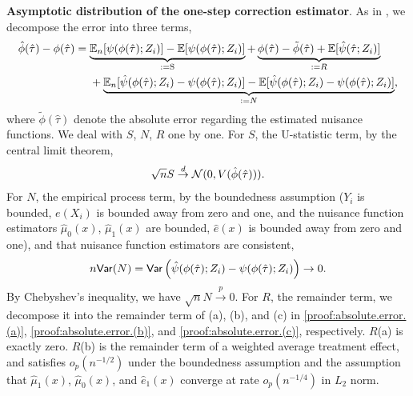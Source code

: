     \noindent \textbf{Asymptotic distribution of the one-step correction estimator}.
    As in \cite{kennedy2022semiparametric}, we decompose the error into three terms,    
    \begin{align*}
    \hat{\phi}(\hat{\tau}) - {\phi}(\hat{\tau})
        &= \underbrace{\mathbb{E}_n[{\psi}(\phi(\hat{\tau}); Z_i)] - \mathbb{E}[{\psi}(\phi(\hat{\tau}); Z_i)]}_{:=\text{S}}  + \underbrace{{\phi}(\hat{\tau}) - \tilde{\phi}(\hat{\tau}) + \mathbb{E}[\hat{\psi}(\hat{\tau}; Z_i)]}_{:=R} \\
        &\quad~+ \underbrace{\mathbb{E}_n[\hat{\psi}(\phi(\hat{\tau}); Z_i) - {\psi}(\phi(\hat{\tau}); Z_i)] - \mathbb{E}[\hat{\psi}(\phi(\hat{\tau}); Z_i) - {\psi}(\phi(\hat{\tau}); Z_i)]}_{:=N},
    \end{align*}
    where $\tilde{\phi}(\hat{\tau})$ denote the absolute error regarding the estimated nuisance functions.
    We deal with $S$, $N$, $R$ one by one.
    For $S$, the U-statistic term, by the central limit theorem, 
    \begin{align}\label{proof:absolute.error.S}
        \begin{split}
            \sqrt{n} S \stackrel{d}{\to} \mathcal{N}(0, V(\hat{\phi}(\hat{\tau}))).
        \end{split}
    \end{align}
    For $N$, the empirical process term, by the boundedness assumption ($Y_i$ is bounded, $e(X_i)$ is bounded away from zero and one, and the nuisance function estimators $\hat{\mu}_0(x)$, $\hat{\mu}_1(x)$ are bounded, $\hat{e}(x)$ is bounded away from zero and one), and that nuisance function estimators are consistent,
    \begin{align}\label{proof:absolute.error.N}
        n \mathsf{Var}(N)
        = \mathsf{Var}\left(\hat{\psi}(\phi(\hat{\tau}); Z_i) - {\psi}(\phi(\hat{\tau}); Z_i)\right)
        \to 0.
    \end{align}
    By Chebyshev's inequality, we have $\sqrt{n}N \stackrel{p}{\to} 0$.
    For $R$, the remainder term, we decompose it into the remainder term of (a), (b), and (c) in \eqref{proof:absolute.error.(a)}, \eqref{proof:absolute.error.(b)}, and \eqref{proof:absolute.error.(c)}, respectively.
    $R$(a) is exactly zero. 
    $R$(b) is the remainder term of a weighted average treatment effect, and satisfies $o_p(n^{-1/2})$ under the boundedness assumption and the assumption that $\hat{\mu}_1(x)$, $\hat{\mu}_0(x)$, and $\hat{e}_1(x)$ converge at rate $o_p(n^{-1/4})$ in $L_2$ norm.
